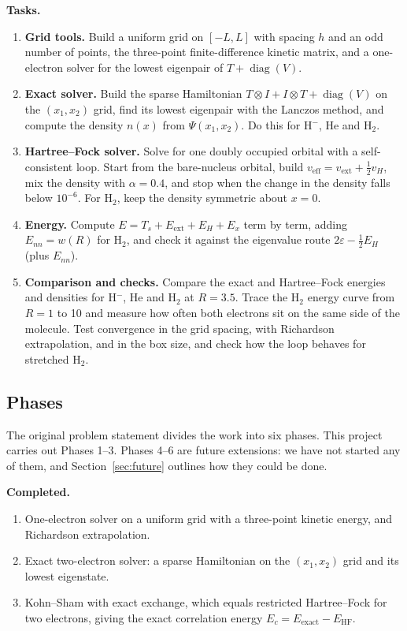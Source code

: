 \documentclass[11pt,a4paper]{article}
\begin{document}
\textbf{Tasks.}
\begin{enumerate}[leftmargin=*]
  \item \textbf{Grid tools.} Build a uniform grid on $[-L,L]$ with spacing $h$ and an odd number of points, the
        three-point finite-difference kinetic matrix, and a one-electron solver for the lowest eigenpair of
        $T+\operatorname{diag}(V)$.
  \item \textbf{Exact solver.} Build the sparse Hamiltonian $T\otimes I+I\otimes T+\operatorname{diag}(V)$ on the $(x_1,x_2)$
        grid, find its lowest eigenpair with the Lanczos method, and compute the density $n(x)$ from $\Psi(x_1,x_2)$.
        Do this for H$^-$, He and H$_2$.
  \item \textbf{Hartree--Fock solver.} Solve for one doubly occupied orbital with a self-consistent loop. Start from
        the bare-nucleus orbital, build $v_\text{eff}=v_\text{ext}+\tfrac12v_H$, mix the density with $\alpha=0.4$, and stop when
        the change in the density falls below $10^{-6}$. For H$_2$, keep the density symmetric about $x=0$.
  \item \textbf{Energy.} Compute $E=T_s+E_\text{ext}+E_H+E_x$ term by term, adding $E_{nn}=w(R)$ for H$_2$, and check it
        against the eigenvalue route $2\varepsilon-\tfrac12E_H$ (plus $E_{nn}$).
  \item \textbf{Comparison and checks.} Compare the exact and Hartree--Fock energies and densities for H$^-$, He and
        H$_2$ at $R=3.5$. Trace the H$_2$ energy curve from $R=1$ to 10 and measure how often both electrons sit on
        the same side of the molecule. Test convergence in the grid spacing, with Richardson extrapolation, and in
        the box size, and check how the loop behaves for stretched H$_2$.
\end{enumerate}

\subsection{Phases}

The original problem statement divides the work into six phases. This project carries out Phases 1--3.
Phases 4--6 are future extensions: we have not started any of them, and Section~\ref{sec:future} outlines how
they could be done.

\textbf{Completed.}
\begin{enumerate}[label=\textbf{Phase \arabic*.},leftmargin=*]
  \item One-electron solver on a uniform grid with a three-point kinetic energy, and Richardson extrapolation.
  \item Exact two-electron solver: a sparse Hamiltonian on the $(x_1,x_2)$ grid and its lowest eigenstate.
  \item Kohn--Sham with exact exchange, which equals restricted Hartree--Fock for two electrons, giving the
        exact correlation energy $E_c=E_\text{exact}-E_\text{HF}$.
\end{enumerate}
\end{document}
